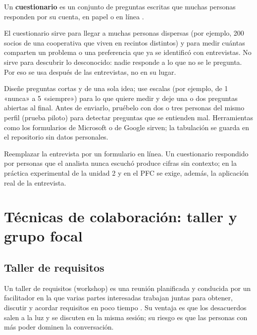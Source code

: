 \documentclass[11pt,a4paper,oneside]{report}
\begin{document}
\begin{definicion}
	Un \textbf{cuestionario} es un conjunto de preguntas escritas que muchas personas responden por su cuenta, en papel o en línea \citep{zowghi_coulin_2005,ireb_cpre_fl_2026}.
\end{definicion}

El cuestionario sirve para llegar a muchas personas dispersas (por ejemplo, 200 socios de una cooperativa que viven en recintos distintos) y para medir cuántas comparten un problema o una preferencia que ya se identificó con entrevistas. No sirve para descubrir lo desconocido: nadie responde a lo que no se le pregunta. Por eso se usa después de las entrevistas, no en su lugar.

\begin{enlapractica}
	Diseñe preguntas cortas y de una sola idea; use escalas (por ejemplo, de 1 «nunca» a 5 «siempre») para lo que quiere medir y deje una o dos preguntas abiertas al final. Antes de enviarlo, pruébelo con dos o tres personas del mismo perfil (prueba piloto) para detectar preguntas que se entienden mal. Herramientas como los formularios de Microsoft o de Google sirven; la tabulación se guarda en el repositorio sin datos personales.
\end{enlapractica}

\begin{cuidado}
	Reemplazar la entrevista por un formulario en línea. Un cuestionario respondido por personas que el analista nunca escuchó produce cifras sin contexto; en la práctica experimental de la unidad 2 y en el PFC se exige, además, la aplicación real de la entrevista.
\end{cuidado}

\section{Técnicas de colaboración: taller y grupo focal}

\subsection{Taller de requisitos}

Un taller de requisitos (workshop) es una reunión planificada y conducida por un facilitador en la que varias partes interesadas trabajan juntas para obtener, discutir y acordar requisitos en poco tiempo \citep{wiegers_beatty_2013,zowghi_coulin_2005}. Su ventaja es que los desacuerdos salen a la luz y se discuten en la misma sesión; su riesgo es que las personas con más poder dominen la conversación.
\end{document}
